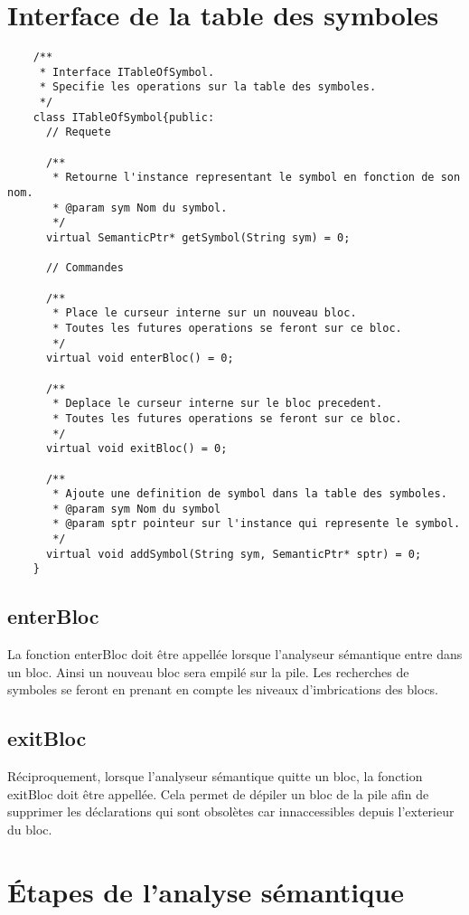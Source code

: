 \documentclass{../../res/univ-projet}
\begin{document}
  \section{Interface de la table des symboles}
    \begin{verbatim}
    /**
     * Interface ITableOfSymbol.
     * Specifie les operations sur la table des symboles.
     */
    class ITableOfSymbol{public:
      // Requete

      /**
       * Retourne l'instance representant le symbol en fonction de son nom.
       * @param sym Nom du symbol.
       */
      virtual SemanticPtr* getSymbol(String sym) = 0;

      // Commandes

      /**
       * Place le curseur interne sur un nouveau bloc.
       * Toutes les futures operations se feront sur ce bloc.
       */
      virtual void enterBloc() = 0;

      /**
       * Deplace le curseur interne sur le bloc precedent.
       * Toutes les futures operations se feront sur ce bloc.
       */
      virtual void exitBloc() = 0;

      /**
       * Ajoute une definition de symbol dans la table des symboles.
       * @param sym Nom du symbol
       * @param sptr pointeur sur l'instance qui represente le symbol.
       */
      virtual void addSymbol(String sym, SemanticPtr* sptr) = 0;
    }
    \end{verbatim}

    \subsection{enterBloc}
      La fonction enterBloc doit être appellée lorsque l'analyseur sémantique entre dans un bloc. Ainsi un nouveau bloc sera empilé sur la pile. Les recherches de symboles se feront en prenant en compte les niveaux d'imbrications des blocs.
    \subsection{exitBloc}
     Réciproquement, lorsque l'analyseur sémantique quitte un bloc, la fonction exitBloc doit être appellée. Cela permet de dépiler un bloc de la pile afin de supprimer les déclarations qui sont obsolètes car innaccessibles depuis l'exterieur du bloc.


\section{Étapes de l'analyse sémantique}
\end{document}
